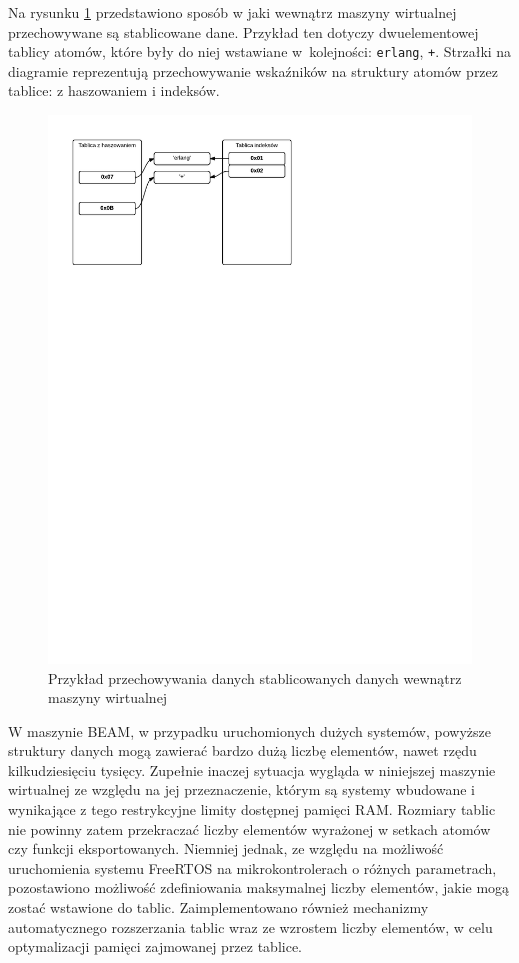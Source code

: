 Na rysunku \ref{fig:atomtable} przedstawiono sposób w jaki wewnątrz maszyny wirtualnej przechowywane są stablicowane dane.  Przykład ten dotyczy dwuelementowej tablicy atomów, które były do niej wstawiane w~kolejności: \texttt{erlang}, \texttt{+}. Strzałki na diagramie reprezentują przechowywanie wskaźników na struktury atomów przez tablice: z haszowaniem i indeksów.

\begin{figure}[h]
\centerline{\includegraphics[scale=1, clip, trim=10mm 200mm 90mm 10mm]{atom_table}}
\caption{Przykład przechowywania danych stablicowanych danych wewnątrz maszyny wirtualnej}
\label{fig:atomtable}
\end{figure}

W maszynie BEAM, w przypadku uruchomionych dużych systemów, powyższe struktury danych mogą zawierać bardzo dużą liczbę elementów, nawet rzędu kilkudziesięciu tysięcy. Zupełnie inaczej sytuacja wygląda w niniejszej maszynie wirtualnej ze względu na jej przeznaczenie, którym są systemy wbudowane i wynikające z tego restrykcyjne limity dostępnej pamięci RAM. Rozmiary tablic nie powinny zatem przekraczać liczby elementów wyrażonej w setkach atomów czy funkcji eksportowanych. Niemniej jednak, ze względu na możliwość uruchomienia systemu FreeRTOS na mikrokontrolerach o różnych parametrach, pozostawiono możliwość zdefiniowania maksymalnej liczby elementów, jakie mogą zostać wstawione do tablic. Zaimplementowano również mechanizmy automatycznego rozszerzania tablic wraz ze wzrostem liczby elementów, w celu optymalizacji pamięci zajmowanej przez tablice.

